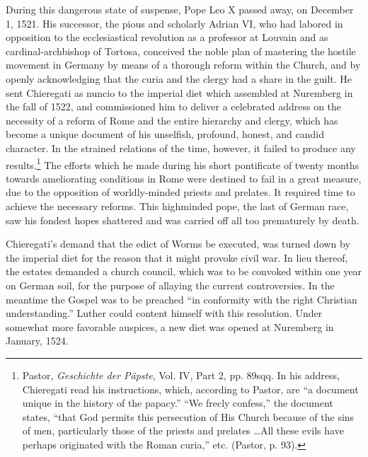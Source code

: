 During this dangerous state of suspense, Pope Leo X passed away,
on December 1, 1521. His successor, the pious and scholarly Adrian
VI, who had labored in opposition to the ecclesiastical revolution as
a professor at Louvain and as cardinal-archbishop of Tortosa, conceived
the noble plan of mastering the hostile movement in Germany
by means of a thorough reform within the Church, and by openly
acknowledging that the curia and the clergy had a share in the guilt.
He sent Chieregati as nuncio to the imperial diet which assembled at
Nuremberg in the fall of 1522, and commissioned him to deliver
a celebrated address on the necessity of a reform of Rome and the
entire hierarchy and clergy, which has become a unique document of
his unselfish, profound, honest, and candid character. In the strained
relations of the time, however, it failed to produce any results.\footnote
{Pastor, \textit{Geschichte der Päpste}, Vol. IV, Part 2, pp. 89sqq. In his address, Chieregati
read his instructions, which, according to Pastor, are “a document unique in the history
of the papacy.” “We frecly confess,” the document states, “that God permits this persecution
of His Church because of the sins of men, particularly those of the priests and prelates
\dots All these evils have perhaps originated with the Roman curia,” etc. (Pastor,
p. 93).}
The efforts which he made during his short pontificate of twenty months
towards ameliorating conditions in Rome were destined to fail in a
great measure, due to the opposition of worldly-minded priests and
prelates. It required time to achieve the necessary reforms. This highminded
pope, the last of German race, saw his fondest hopes shattered
and was carried off all too prematurely by death.

Chieregati’s demand that the edict of Worms be executed, was
turned down by the imperial diet for the reason that it might provoke civil
war. In lieu thereof, the estates demanded a church council,
which was to be convoked within one year on German soil, for the
purpose of allaying the current controversies. In the meantime the
Gospel was to be preached “in conformity with the right Christian
understanding.” Luther could content himself with this resolution.
Under somewhat more favorable auspices, a new diet was opened
at Nuremberg in January, 1524.

